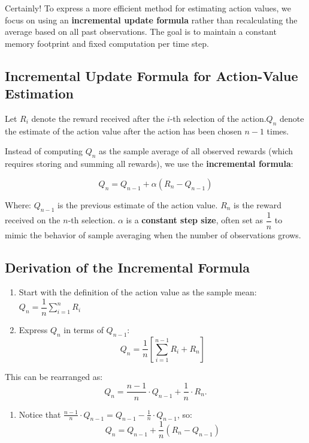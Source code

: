 \documentclass[
  letterpaper,
]{krantz}
\providecommand{\tightlist}{%
  \setlength{\itemsep}{0pt}\setlength{\parskip}{0pt}}\usepackage{longtable,booktabs,array}
\theoremstyle{plain}
\theoremstyle{definition}
\theoremstyle{definition}
\theoremstyle{remark}
\begin{document}
Certainly! To express a more efficient method for estimating action
values, we focus on using an \textbf{incremental update formula} rather
than recalculating the average based on all past observations. The goal
is to maintain a constant memory footprint and fixed computation per
time step.

\subsection{Incremental Update Formula for Action-Value
Estimation}\label{incremental-update-formula-for-action-value-estimation}

Let \(R_i\) denote the reward received after the \(i\)-th selection of
the action.\(Q_n\) denote the estimate of the action value after the
action has been chosen \(n-1\) times.

Instead of computing \(Q_n\) as the sample average of all observed
rewards (which requires storing and summing all rewards), we use the
\textbf{incremental formula}:

\[
    Q_n = Q_{n-1} + \alpha \left(R_n - Q_{n-1}\right) 
\]

Where: \(Q_{n-1}\) is the previous estimate of the action value. \(R_n\)
is the reward received on the \(n\)-th selection. \(\alpha\) is a
\textbf{constant step size}, often set as \(\dfrac{1}{n}\) to mimic the
behavior of sample averaging when the number of observations grows.

\subsection{Derivation of the Incremental
Formula}\label{derivation-of-the-incremental-formula}

\begin{enumerate}
\def\labelenumi{\arabic{enumi}.}
\item
  Start with the definition of the action value as the sample mean:
  \(\displaystyle Q_n =\dfrac{1}{n} \sum_{i=1}^{n} R_i\)
\item
  Express \(Q_n\) in terms of \(Q_{n-1}\): \[
  Q_n = \frac{1}{n}
  \left[ \sum_{i=1}^{n-1} R_i + R_n \right]
  \]
\end{enumerate}

This can be rearranged as: \[
        Q_n = \frac{n-1}{n} \cdot Q_{n-1} +
    \frac{1}{n} \cdot R_n. 
\]

\begin{enumerate}
\def\labelenumi{\arabic{enumi}.}
\setcounter{enumi}{2}
\tightlist
\item
  Notice that \(\displaystyle
      \frac{n-1}{n} \cdot Q_{n-1} = Q_{n-1} - \frac{1}{n}\cdot Q_{n-1}\),
  so: \[ 
      Q_n = Q_{n-1} + \frac{1}{n} \left(R_n -Q_{n-1}\right)
  \]
\end{enumerate}
\end{document}
